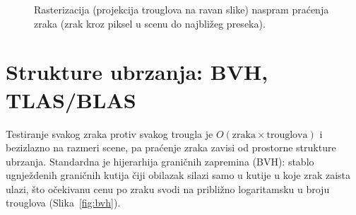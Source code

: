 \begin{figure}[tbp]
\centering
{}
\caption[Rasterizacija naspram pra\'cenja zraka]{Rasterizacija (projekcija trouglova na ravan slike) naspram pra\'cenja zraka (zrak kroz
piksel u scenu do najbli\v{z}eg preseka).}
\label{fig:rastervsrt}
\end{figure}

\section{Strukture ubrzanja: BVH, TLAS/BLAS}
\label{sec:accel-pregled}

Testiranje svakog zraka protiv svakog trougla je $O(\text{zraka} \times \text{trouglova})$ i bezizlazno na
razmeri scene, pa pra\'cenje zraka zavisi od prostorne strukture ubrzanja. Standardna je hijerarhija
grani\v{c}nih zapremina (BVH): stablo ugnje\v{z}denih grani\v{c}nih kutija \v{c}iji obilazak silazi samo u kutije u
koje zrak zaista ulazi, \v{s}to o\v{c}ekivanu cenu po zraku svodi na pribli\v{z}no logaritamsku u broju
trouglova (Slika~\ref{fig:bvh}).

